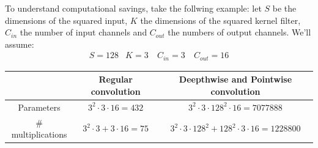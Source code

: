 \noindent
To understand computational savings, take the follwing example: let $S$ be the dimensions of the squared 
input, $K$ the dimensions of the squared kernel filter, $C_{in}$ the number of input channels and $C_{out}$
the numbers of output channels. We'll assume:
$$\begin{matrix}
    S=128 & K=3 \ & C_{in}=3 \ & C_{out}=16
\end{matrix}$$ \vspace{-2em}
\begin{table}[H]
    \centering
    \begin{tabular}{|c|c|c|} \hline
    & Regular convolution & Deepthwise and Pointwise convolution \\ \hline
    Parameters & $3^2\cdot3\cdot16=432$ & $3^2\cdot3\cdot128^2\cdot16=\num{7077888}$ \\
    \# multiplications & $3^2\cdot3+3\cdot16=75$ & $3^2\cdot3\cdot128^2+128^2\cdot3\cdot16=\num{1228800}$ \\
    \hline
    \end{tabular}
\end{table}

